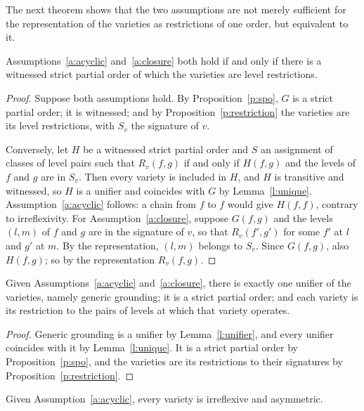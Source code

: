 \documentclass{situationist-preprint}
\begin{document}
The next theorem shows that the two assumptions are not merely sufficient for the representation of the varieties as restrictions of one order, but equivalent to it.

\begin{theorem}[Characterization]\label{t:char}
Assumptions~\ref{a:acyclic} and~\ref{a:closure} both hold if and only if there is a witnessed strict partial order of which the varieties are level restrictions.
\end{theorem}

\begin{proof}
Suppose both assumptions hold. By Proposition~\ref{p:spo}, $G$ is a strict partial order; it is witnessed; and by Proposition~\ref{p:restriction} the varieties are its level restrictions, with $S_v$ the signature of $v$.

Conversely, let $H$ be a witnessed strict partial order and $S$ an assignment of classes of level pairs such that $R_v(f,g)$ if and only if $H(f,g)$ and the levels of $f$ and $g$ are in $S_v$. Then every variety is included in $H$, and $H$ is transitive and witnessed, so $H$ is a unifier and coincides with $G$ by Lemma~\ref{l:unique}. Assumption~\ref{a:acyclic} follows: a chain from $f$ to $f$ would give $H(f,f)$, contrary to irreflexivity. For Assumption~\ref{a:closure}, suppose $G(f,g)$ and the levels $(l,m)$ of $f$ and $g$ are in the signature of $v$, so that $R_v(f',g')$ for some $f'$ at $l$ and $g'$ at $m$. By the representation, $(l,m)$ belongs to $S_v$. Since $G(f,g)$, also $H(f,g)$; so by the representation $R_v(f,g)$.
\end{proof}

\begin{theorem}\label{t:unity}
Given Assumptions~\ref{a:acyclic} and~\ref{a:closure}, there is exactly one unifier of the varieties, namely generic grounding; it is a strict partial order; and each variety is its restriction to the pairs of levels at which that variety operates.
\end{theorem}

\begin{proof}
Generic grounding is a unifier by Lemma~\ref{l:unifier}, and every unifier coincides with it by Lemma~\ref{l:unique}. It is a strict partial order by Proposition~\ref{p:spo}, and the varieties are its restrictions to their signatures by Proposition~\ref{p:restriction}.
\end{proof}

\begin{corollary}\label{c:profile}
Given Assumption~\ref{a:acyclic}, every variety is irreflexive and asymmetric.
\end{corollary}
\end{document}
